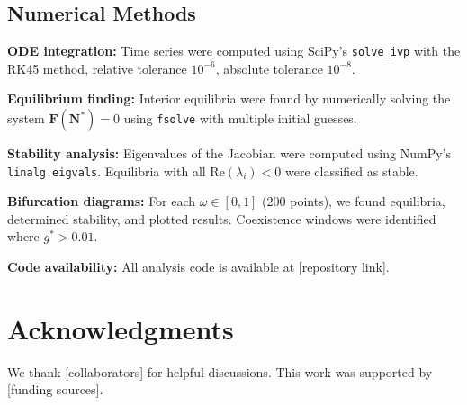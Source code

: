 \documentclass[11pt]{article}
\begin{document}
\subsection{Numerical Methods}

\textbf{ODE integration:} Time series were computed using SciPy's \texttt{solve\_ivp} with the RK45 method, relative tolerance $10^{-6}$, absolute tolerance $10^{-8}$.

\textbf{Equilibrium finding:} Interior equilibria were found by numerically solving the system $\mathbf{F}(\mathbf{N}^*) = 0$ using \texttt{fsolve} with multiple initial guesses.

\textbf{Stability analysis:} Eigenvalues of the Jacobian were computed using NumPy's \texttt{linalg.eigvals}. Equilibria with all $\text{Re}(\lambda_i) < 0$ were classified as stable.

\textbf{Bifurcation diagrams:} For each $\omega \in [0, 1]$ (200 points), we found equilibria, determined stability, and plotted results. Coexistence windows were identified where $g^* > 0.01$.

\textbf{Code availability:} All analysis code is available at [repository link].

\section*{Acknowledgments}

We thank [collaborators] for helpful discussions. This work was supported by [funding sources].
\end{document}
